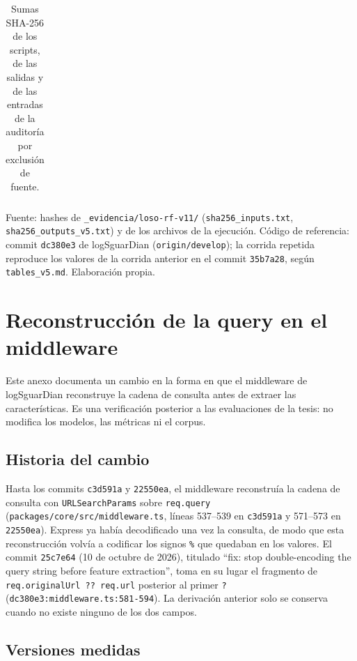 \begin{table}[htbp]
\begin{tabular}{|p{0.36\linewidth}|p{0.58\linewidth}|}
\end{tabular}
\caption{Sumas SHA-256 de los scripts, de las salidas y de las entradas de la auditoría por exclusión de fuente.}
\label{tabla:loso-procedencia}
\par\smallskip\footnotesize Fuente: hashes de \texttt{\_\allowbreak{}evidencia/loso-rf-v11/} (\texttt{sha256\_\allowbreak{}inputs.txt}, \texttt{sha256\_\allowbreak{}outputs\_\allowbreak{}v5.txt}) y de los archivos de la ejecución. Código de referencia: commit \texttt{dc380e3} de logSguarDian (\texttt{origin/develop}); la corrida repetida reproduce los valores de la corrida anterior en el commit \texttt{35b7a28}, según \texttt{tables\_\allowbreak{}v5.md}. Elaboración propia.
\end{table}

\section{Reconstrucción de la query en el middleware}\label{anexo:query}

Este anexo documenta un cambio en la forma en que el middleware de logSguarDian reconstruye la cadena de consulta antes de extraer las características. Es una verificación posterior a las evaluaciones de la tesis: no modifica los modelos, las métricas ni el corpus.

\subsection{Historia del cambio}

Hasta los commits \texttt{c3d591a} y \texttt{22550ea}, el middleware reconstruía la cadena de consulta con \texttt{URLSearchParams} sobre \texttt{req.query} (\texttt{packages/core/src/}\allowbreak\texttt{middleware.ts}, líneas 537--539 en \texttt{c3d591a} y 571--573 en \texttt{22550ea}). Express ya había decodificado una vez la consulta, de modo que esta reconstrucción volvía a codificar los signos \texttt{\%} que quedaban en los valores. El commit \texttt{25c7e64} (10 de octubre de 2026), titulado ``fix: stop double-encoding the query string before feature extraction'', toma en su lugar el fragmento de \texttt{req.originalUrl ?? req.url} posterior al primer \texttt{?} (\texttt{dc380e3:middleware.ts:581-594}). La derivación anterior solo se conserva cuando no existe ninguno de los dos campos.

\subsection{Versiones medidas}

